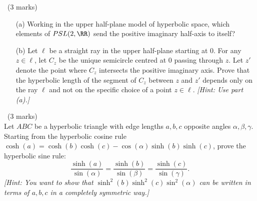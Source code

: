 \documentclass[12pt]{article}
\begin{document}
\newpage

\begin{question}\ (3 marks)\\
\begin{enumerate}
\item[(a)]  Working in the upper half-plane model of hyperbolic space, which elements of $PSL(2,\RR)$ send the positive imaginary half-axis to itself?

\item[(b)]  Let $\ell$ be a straight ray in the upper half-plane starting at $0$. For any $z\in\ell$, let $C_z$ be the unique semicircle centred at 0 passing through $z$. Let $z'$ denote the point where $C_z$ intersects the positive imaginary axis. Prove that the hyperbolic length of the segment of $C_z$ between $z$ and $z'$ depends only on the ray $\ell$ and not on the specific choice of a point $z\in\ell$. {\em [Hint: Use part (a).]}
\end{enumerate}
\end{question}

\iffalse
\begin{answer}
  Such M\"obius transformations must fix or switch $0$ and $\infty$, hence they are of the form $z\mapsto az$ or $z\mapsto -a/z$, $a>0$ real. Different choices of $z$ on the ray $\ell$ are related by multiplication by a positive real number. Let $z$ and $kz$ be two such choices. Then $C_{kz}=kC_z$ and the positive imaginary axis is preserved, so $(kz)'=kz'$ and since $PSL(2,\CC)$ acts by hyperbolic isometries, the hyperbolic length of the segments of $C_z$ between $z,z'$ and $kC_z$ between $kz,kz'$ agree.
\end{answer}
\newpage
\fi

\vspace{1cm}

\begin{question}\ (3 marks)\\
  Let $ABC$ be a hyperbolic triangle with edge lengths $a,b,c$ opposite angles $\alpha,\beta,\gamma$. Starting from the hyperbolic cosine rule $\cosh(a)=\cosh(b)\cosh(c)-\cos(\alpha)\sinh(b)\sinh(c)$, prove the hyperbolic sine rule:
  \[\frac{\sinh(a)}{\sin(\alpha)}=\frac{\sinh(b)}{\sin(\beta)}=\frac{\sinh(c)}{\sin(\gamma)}.\]
  {\em [Hint: You want to show that $\sinh^2(b)\sinh^2(c)\sin^2(\alpha)$ can be written in terms of $a,b,c$ in a completely symmetric way.]}
\end{question}
\end{document}
